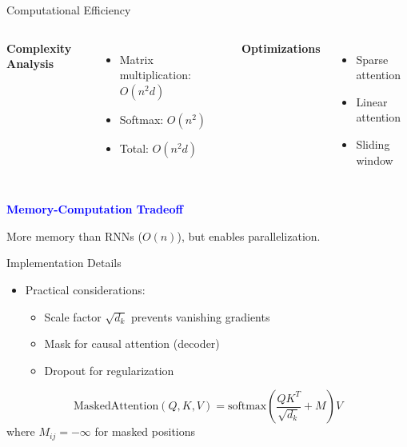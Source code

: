 \documentclass[serif, aspectratio=169]{beamer}
\begin{document}
\begin{frame}{Computational Efficiency}
    \begin{columns}
        \textbf{Complexity Analysis}
        \begin{itemize}
            \item Matrix multiplication: $O(n^2d)$
            \item Softmax: $O(n^2)$
            \item Total: $O(n^2d)$
        \end{itemize}
        
        \textbf{Optimizations}
        \begin{itemize}
            \item Sparse attention
            \item Linear attention
            \item Sliding window
        \end{itemize}
    \end{columns}

    \vspace{0.5cm}
    \textcolor{blue}{\textbf{Memory-Computation Tradeoff}}
    
    \vspace{0.2cm}
    More memory than RNNs ($O(n)$), but enables parallelization.
    
\end{frame}

\begin{frame}{Implementation Details}
    \begin{itemize}
        \item Practical considerations:
        \begin{itemize}
            \item Scale factor $\sqrt{d_k}$ prevents vanishing gradients
            \item Mask for causal attention (decoder)
            \item Dropout for regularization
        \end{itemize}
    \end{itemize}
    \begin{equation*}
        \text{MaskedAttention}(Q, K, V) = \text{softmax}\left(\frac{QK^T}{\sqrt{d_k}} + M\right)V
    \end{equation*}
    where $M_{ij} = -\infty$ for masked positions
\end{frame}
\end{document}
